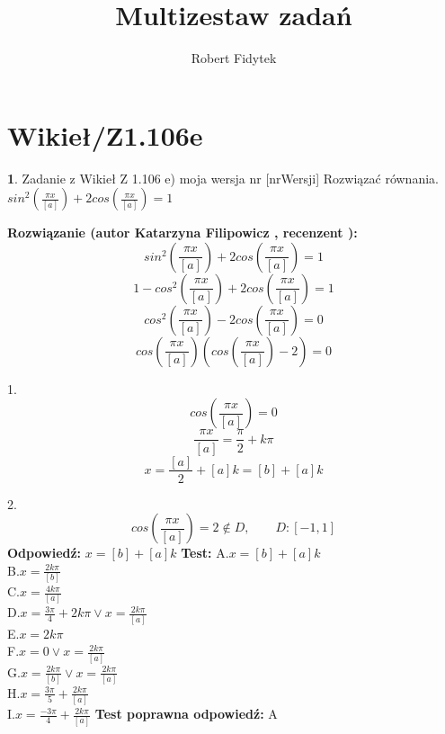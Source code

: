 \documentclass[12pt, a4paper]{article}
\title{Multizestaw zadań}
\author{Robert Fidytek}
\date{}
\theoremstyle{definition} %
\newtheorem{zad}{}
\newcommand{\kategoria}[1]{\section{#1}} %
\newcommand{\zadStart}[1]{\begin{zad}#1\newline} %
\newcommand{\zadStop}{\end{zad}}   %
\newcommand{\rozwStart}[2]{\noindent \textbf{Rozwiązanie (autor #1 , recenzent #2): }\newline} %
\newcommand{\rozwStop}{\newline}                                            %
\newcommand{\odpStart}{\noindent \textbf{Odpowiedź:}\newline}    %
\newcommand{\odpStop}{\newline}                                             %
\newcommand{\testStart}{\noindent \textbf{Test:}\newline} %
\newcommand{\testStop}{\newline} %
\newcommand{\kluczStart}{\noindent \textbf{Test poprawna odpowiedź:}\newline} %
\newcommand{\kluczStop}{\newline} %
\begin{document}
\maketitle


\kategoria{Wikieł/Z1.106e}
\zadStart{Zadanie z Wikieł Z 1.106 e) moja wersja nr [nrWersji]}
Rozwiązać równania.\\
 $sin^2\left(\frac{\pi x}{[a]}\right)+2cos\left(\frac{\pi x}{[a]}\right)=1$
\zadStop
\rozwStart{Katarzyna Filipowicz}{}
$$
sin^2\left(\frac{\pi x}{[a]}\right)+2cos\left(\frac{\pi x}{[a]}\right)=1
$$ $$
1-cos^2\left(\frac{\pi x}{[a]}\right)+2cos\left(\frac{\pi x}{[a]}\right)=1
$$ $$
cos^2\left(\frac{\pi x}{[a]}\right)-2cos\left(\frac{\pi x}{[a]}\right)=0
$$ $$
cos\left(\frac{\pi x}{[a]}\right)\left(cos\left(\frac{\pi x}{[a]}\right)-2\right)=0
$$

1. $$
cos\left(\frac{\pi x}{[a]}\right)=0 
$$ $$
\frac{\pi x}{[a]}=\frac{\pi}{2}+k\pi
$$ $$
x=\frac{[a]}{2}+[a]k=[b]+[a]k
$$

2. $$
cos\left(\frac{\pi x}{[a]}\right)=2 \notin D, \qquad D:[-1,1]
$$
\rozwStop
\odpStart
$x=[b]+[a]k$
\odpStop
\testStart
A.$x=[b]+[a]k$\\
B.$x=\frac{2k\pi}{[b]}$\\
C.$x=\frac{4k\pi}{[a]}$\\
D.$x=\frac{3\pi}{4}+2k\pi \vee x=\frac{2k\pi}{[a]}$\\
E.$x=2k\pi$\\
F.$x=0 \vee x=\frac{2k\pi}{[a]}$\\
G.$x=\frac{2k\pi}{[b]} \vee x=\frac{2k\pi}{[a]}$\\
H.$x=\frac{3\pi}{5}+\frac{2k\pi}{[a]}$\\
I.$x=\frac{-3\pi}{4}+\frac{2k\pi}{[a]}$
\testStop
\kluczStart
A
\kluczStop
\end{document}
